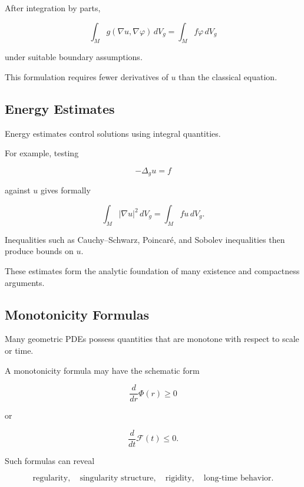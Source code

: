 After integration by parts,

\[
\boxed{
\int_M
g(\nabla u,\nabla\varphi)
\,dV_g
=
\int_M
f\varphi
\,dV_g
}
\]

under suitable boundary assumptions.

This formulation requires fewer derivatives of \(u\) than the classical
equation.

\subsection{Energy Estimates}
\label{subsec:geometric-energy-estimates}

Energy estimates control solutions using integral quantities.

For example, testing

\[
-\Delta_g u=f
\]

against \(u\) gives formally

\[
\boxed{
\int_M
|\nabla u|^2
\,dV_g
=
\int_M
fu
\,dV_g.
}
\]

Inequalities such as Cauchy--Schwarz, Poincar\'e, and Sobolev inequalities
then produce bounds on \(u\).

These estimates form the analytic foundation of many existence and
compactness arguments.

\subsection{Monotonicity Formulas}
\label{subsec:geometric-monotonicity-formulas}

Many geometric PDEs possess quantities that are monotone with respect to
scale or time.

A monotonicity formula may have the schematic form

\[
\boxed{
\frac{d}{dr}\Phi(r)\geq0
}
\]

or

\[
\boxed{
\frac{d}{dt}\mathcal F(t)\leq0.
}
\]

Such formulas can reveal

\[
\boxed{
\text{regularity},
\quad
\text{singularity structure},
\quad
\text{rigidity},
\quad
\text{long-time behavior}.
}
\]

